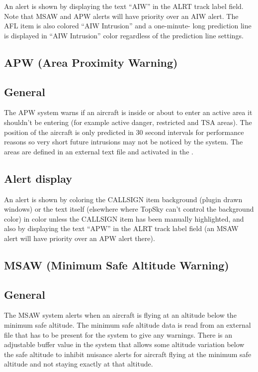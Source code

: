 \documentclass[11pt,a4paper]{memoir}
\newcommand{\colorref}[1]{\textit{\hyperref[#1]{\StrDel{#1}{color:}}}}
\begin{document}
An alert is shown by displaying the text “AIW” in the ALRT track label field. Note that MSAW and APW alerts will have priority over an AIW alert. The AFL item is also colored “AIW Intrusion” and a one-minute- long prediction line is displayed in “AIW Intrusion” color regardless of the prediction line settings.


\subsection{APW (Area Proximity Warning)}

\subsection*{General}

The APW system warns if an aircraft is inside or about to enter an active area it shouldn’t be entering (for example active danger, restricted and TSA areas). The position of the aircraft is only predicted in 30 second intervals for performance reasons so very short future intrusions may not be noticed by the system. The areas are defined in an external text file and activated in the \textit{}.

\subsection*{Alert display}

An alert is shown by coloring the CALLSIGN item background (plugin drawn windows) or the text itself (elsewhere where TopSky can’t control the background color) in \colorref{color:Warning} color unless the CALLSIGN item has been manually highlighted, and also by displaying the text “APW” in the ALRT track label field (an MSAW alert will have priority over an APW alert there).

\subsection{MSAW (Minimum Safe Altitude Warning)}

\subsection*{General}

The MSAW system alerts when an aircraft is flying at an altitude below the minimum safe altitude. The minimum safe altitude data is read from an external file that has to be present for the system to give any warnings. There is an adjustable buffer value in the system that allows some altitude variation below the safe altitude to inhibit nuisance alerts for aircraft flying at the minimum safe altitude and not staying exactly at that altitude.
\end{document}
